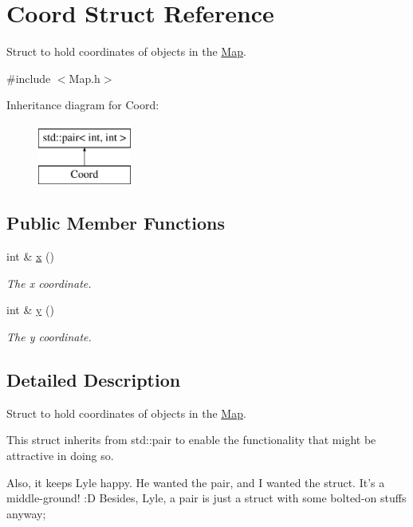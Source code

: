 \hypertarget{structCoord}{\section{Coord Struct Reference}
\label{structCoord}
}


Struct to hold coordinates of objects in the \hyperlink{classMap}{Map}.  




{\ttfamily \#include $<$Map.\-h$>$}

Inheritance diagram for Coord\-:\begin{figure}[H]
\begin{center}
\leavevmode
\includegraphics[height=2.000000cm]{structCoord}
\end{center}
\end{figure}
\subsection*{Public Member Functions}
\begin{DoxyCompactItemize}
\item 
int \& \hyperlink{structCoord_a685dd99f1e32d5e79f1fe6a7bbbceb76}{x} ()
\begin{DoxyCompactList}\small\item\em The x coordinate. \end{DoxyCompactList}\item 
int \& \hyperlink{structCoord_ab924c640df45524f31d54ee5c4870cbc}{y} ()
\begin{DoxyCompactList}\small\item\em The y coordinate. \end{DoxyCompactList}\end{DoxyCompactItemize}


\subsection{Detailed Description}
Struct to hold coordinates of objects in the \hyperlink{classMap}{Map}. 

This struct inherits from std\-::pair to enable the functionality that might be attractive in doing so.

Also, it keeps Lyle happy. He wanted the pair, and I wanted the struct. It's a middle-\/ground! \-:D Besides, Lyle, a pair is just a struct with some bolted-\/on stuffs anyway;

